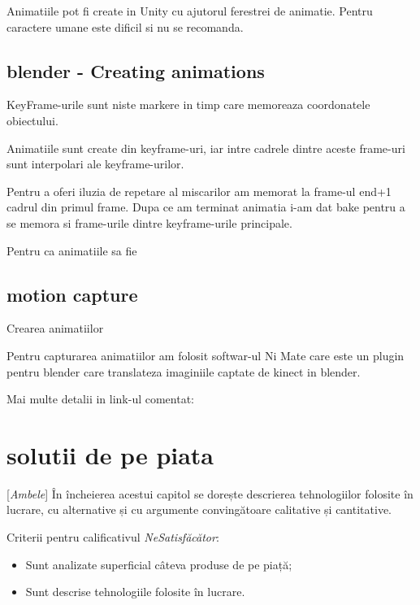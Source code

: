 \documentclass[12pt,a4paper]{report}
\newcommand{\worktype}[1]{[\textit{#1}] }
\newcommand{\dezvoltare}{\worktype{Dezvoltare de produs}}
\newcommand{\ambele}{\worktype{Ambele}}
\begin{document}
Animatiile pot fi create in Unity cu ajutorul ferestrei de animatie. Pentru caractere umane este dificil si nu se recomanda.


\section{blender - Creating animations}
KeyFrame-urile sunt niste markere in timp care memoreaza coordonatele obiectului.

Animatiile sunt create din keyframe-uri, iar intre cadrele dintre aceste frame-uri sunt interpolari ale keyframe-urilor.

Pentru a oferi iluzia de repetare al miscarilor am memorat la frame-ul end+1 cadrul din primul frame. Dupa ce am terminat animatia i-am dat bake pentru a se memora si frame-urile dintre keyframe-urile principale.

Pentru ca animatiile sa fie 


\section{motion capture}
Crearea animatiilor

Pentru capturarea animatiilor am folosit softwar-ul Ni Mate care este un plugin pentru blender care translateza imaginiile captate de kinect in blender.

Mai multe detalii in link-ul comentat:


\chapter{solutii de pe piata}


\ambele În încheierea acestui capitol se dorește descrierea tehnologiilor folosite în lucrare, cu alternative și cu argumente convingătoare calitative și cantitative.  

Criterii pentru calificativul \textit{Ne\textit{Satisfăcător}}: 
\begin{itemize}
	\item \dezvoltare Sunt analizate superficial câteva produse de pe piață; 
	\item \ambele Sunt descrise tehnologiile folosite în lucrare. 
\end{itemize}
\end{document}
